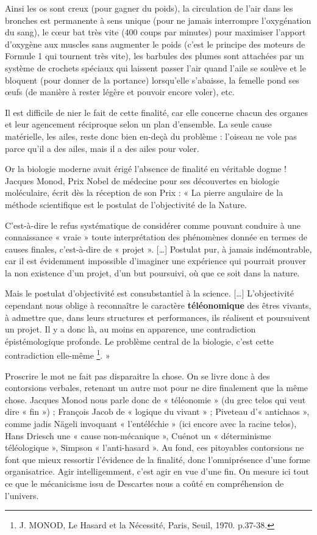 \documentclass[a4paper,12pt]{article}
\begin{document}
Ainsi les os sont creux (pour gagner du poids), la circulation de l'air dans les bronches est permanente à sens unique (pour ne jamais interrompre l'oxygénation du sang), le cœur bat très vite (400 coups par minutes) pour maximiser l'apport d'oxygène aux muscles sans augmenter le poids (c'est le principe des moteurs de Formule 1 qui tournent très vite), les barbules des plumes sont attachées par un système de crochets spéciaux qui laissent passer l'air quand l'aile se soulève et le bloquent (pour donner de la portance) lorsqu'elle s'abaisse, la femelle pond ses œufs (de manière à rester légère et pouvoir encore voler), etc. 

Il est difficile de nier le fait de cette finalité, car elle concerne chacun des organes et leur agencement réciproque selon un plan d'ensemble. La seule cause matérielle, les ailes, reste donc bien en-deçà du problème : l’oiseau ne vole pas parce qu'il a des ailes, mais il a des ailes pour voler.

Or la biologie moderne avait érigé l'absence de finalité en véritable dogme ! Jacques Monod, Prix Nobel de médecine pour ses découvertes en biologie moléculaire, écrit dès la réception de son Prix : « La pierre angulaire de la méthode scientifique est le postulat de l’objectivité de la Nature. 

C’est-à-dire le refus systématique de considérer comme pouvant conduire à une connaissance « vraie » toute interprétation des phénomènes donnée en termes de causes finales, c’est-à-dire de « projet ». […] Postulat pur, à jamais indémontrable, car il est évidemment impossible d’imaginer une expérience qui pourrait prouver la non existence d’un projet, d’un but poursuivi, où que ce soit dans la nature. 

Mais le postulat d’objectivité est consubstantiel à la science. […] L’objectivité cependant nous oblige à reconnaître le caractère \textbf{téléonomique} des êtres vivants, à admettre que, dans leurs structures et performances, ils réalisent et poursuivent un projet. Il y a donc là, au moins en apparence, une contradiction épistémologique profonde. Le problème central de la biologie, c’est cette contradiction elle-même \footnote{J. MONOD, Le Hasard et la Nécessité, Paris, Seuil, 1970. p.37-38.}. »

Proscrire le mot ne fait pas disparaitre la chose. On se livre donc à des contorsions verbales, retenant un autre mot pour ne dire finalement que la même chose. Jacques Monod nous parle donc de « téléonomie » (du grec telos qui veut dire « fin ») ; François Jacob de « logique du vivant » ; Piveteau d'« antichaos », comme jadis Nägeli invoquant « l'entéléchie » (ici encore avec la racine telos), Hans Driesch une « cause non-mécanique », Cuénot un « déterminisme téléologique », Simpson « l’anti-hasard ». Au fond, ces pitoyables contorsions ne font que mieux ressortir l'évidence de la finalité, donc l'omniprésence d'une forme organisatrice. Agir intelligemment, c'est agir en vue d'une fin. On mesure ici tout ce que le mécanicisme issu de Descartes nous a coûté en compréhension de l’univers.
\end{document}
